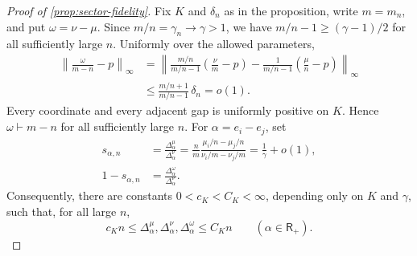 \documentclass[11pt]{article}
\theoremstyle{remark}
\theoremstyle{plain}
\begin{document}
\begin{proof}[Proof of \cref{prop:sector-fidelity}]
Fix \(K\) and \(\delta_n\) as in the proposition, write \(m=m_n\), and put
\(\omega=\nu-\mu\).  Since \(m/n=\gamma_n\to\gamma>1\), we have
\(m/n-1\ge(\gamma-1)/2\) for all sufficiently large \(n\).
Uniformly over the allowed parameters,
\[
\begin{aligned}
  \left\|\frac\omega{m-n}-p\right\|_\infty
  &=\left\|
    \frac{m/n}{m/n-1}\left(\frac\nu m-p\right)
    -\frac1{m/n-1}\left(\frac\mu n-p\right)
  \right\|_\infty\\
  &\le\frac{m/n+1}{m/n-1}\,\delta_n=o(1).
\end{aligned}
\]
Every coordinate and every adjacent gap is uniformly positive on \(K\).
Hence \(\omega\vdash m-n\) for all sufficiently large \(n\).  For
\(\alpha=e_i-e_j\), set
\begin{equation}\label{eq:splitting-fraction}
\begin{aligned}
  s_{\alpha,n}
  &=\frac{\Delta_\alpha^\mu}{\Delta_\alpha^\nu}
    =\frac{n}{m}
      \frac{\mu_i/n-\mu_j/n}{\nu_i/m-\nu_j/m}
    =\frac1\gamma+o(1),\\
  1-s_{\alpha,n}
  &=\frac{\Delta_\alpha^\omega}{\Delta_\alpha^\nu}.
\end{aligned}
\end{equation}
Consequently, there are constants
\(0<c_K<C_K<\infty\), depending only on \(K\) and
\(\gamma\), such that, for all large \(n\),
\begin{equation}\label{eq:uniform-sector-gaps}
  c_Kn
  \le\Delta_\alpha^\mu,\Delta_\alpha^\nu,\Delta_\alpha^\omega
  \le C_Kn
  \qquad(\alpha\in\mathsf R_+).
\end{equation}


\end{proof}
\end{document}
